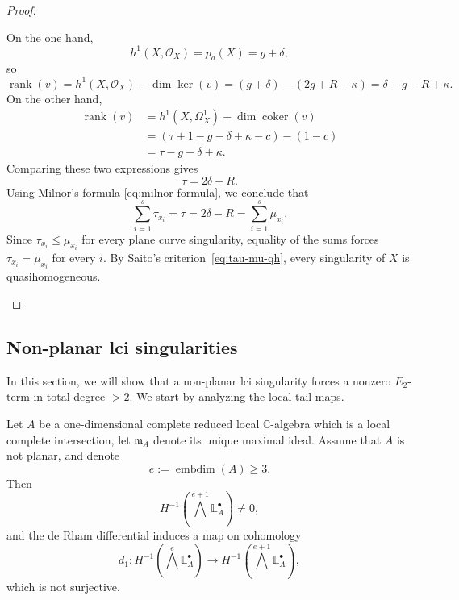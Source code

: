 \documentclass[12pt,reqno]{amsart}
\begin{document}
\begin{proof}
\begin{enumerate}
On the one hand,
\[
h^1(X,\mathcal O_X)=p_a(X)=g+\delta,
\]
so
\[
\operatorname{rank}(v)
=h^1(X,\mathcal O_X)-\dim \ker(v)
=(g+\delta)-(2g+R-\kappa)
=\delta-g-R+\kappa.
\]
On the other hand,
\[
\begin{aligned}
\operatorname{rank}(v)
&=h^1(X,\Omega_X^1)-\dim \operatorname{coker}(v)\\
&=(\tau+1-g-\delta+\kappa-c)-(1-c)\\
&=\tau-g-\delta+\kappa.
\end{aligned}
\]
Comparing these two expressions gives
\[
\tau=2\delta-R.
\]
Using Milnor's formula \eqref{eq:milnor-formula}, we conclude that
\[
\sum_{i=1}^s\tau_{x_i}
=
\tau
=
2\delta-R
=
\sum_{i=1}^s\mu_{x_i}.
\]
Since \(\tau_{x_i}\le \mu_{x_i}\) for every plane curve singularity, equality of the sums forces \(\tau_{x_i}=\mu_{x_i}\) for every \(i\). By Saito's criterion~\eqref{eq:tau-mu-qh}, every singularity of \(X\) is quasihomogeneous.
\end{enumerate}
\end{proof}

\subsection{Non-planar lci singularities}\label{subsec:non-planar-case}

In this section, we will show that a non-planar lci singularity forces a nonzero \(E_2\)-term in total degree \(>2\). We start by analyzing the local tail maps.

\begin{lemma}\label{lem:nonplanar-obstruction}
Let $A$ be a one-dimensional complete reduced local $\mathbb{C}$-algebra which is a local complete intersection, let \(\mathfrak{m}_A\) denote its unique maximal ideal. Assume that $A$ is not planar, and denote
\[
e:=\operatorname{embdim}(A)\ge 3.
\]
Then
\[
H^{-1}\!\left(\bigwedge^{e+1}\mathbb{L}^{\bullet}_A\right)\neq 0,
\]
and the de Rham differential induces a map on cohomology
\[
d_1:H^{-1}\!\left(\bigwedge^e\mathbb{L}^{\bullet}_A\right)\longrightarrow
H^{-1}\!\left(\bigwedge^{e+1}\mathbb{L}^{\bullet}_A\right),
\]
which is not surjective.
\end{lemma}
\end{document}
